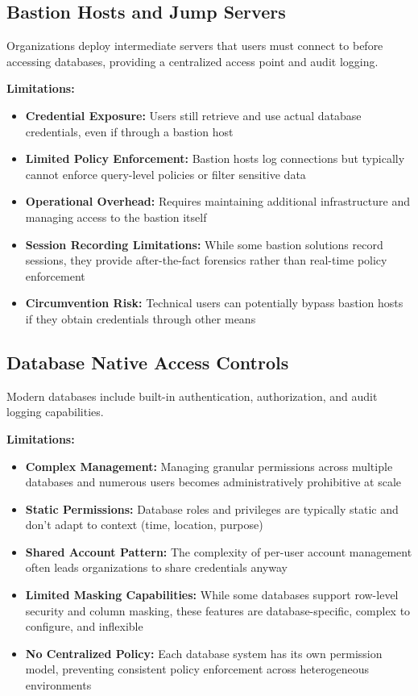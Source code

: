\subsection{Bastion Hosts and Jump Servers}
Organizations deploy intermediate servers that users must connect to before accessing databases, providing a centralized access point and audit logging.

\textbf{Limitations:}
\begin{itemize}
    \item \textbf{Credential Exposure:} Users still retrieve and use actual database credentials, even if through a bastion host
    \item \textbf{Limited Policy Enforcement:} Bastion hosts log connections but typically cannot enforce query-level policies or filter sensitive data
    \item \textbf{Operational Overhead:} Requires maintaining additional infrastructure and managing access to the bastion itself
    \item \textbf{Session Recording Limitations:} While some bastion solutions record sessions, they provide after-the-fact forensics rather than real-time policy enforcement
    \item \textbf{Circumvention Risk:} Technical users can potentially bypass bastion hosts if they obtain credentials through other means
\end{itemize}

\subsection{Database Native Access Controls}
Modern databases include built-in authentication, authorization, and audit logging capabilities.

\textbf{Limitations:}
\begin{itemize}
    \item \textbf{Complex Management:} Managing granular permissions across multiple databases and numerous users becomes administratively prohibitive at scale
    \item \textbf{Static Permissions:} Database roles and privileges are typically static and don't adapt to context (time, location, purpose)
    \item \textbf{Shared Account Pattern:} The complexity of per-user account management often leads organizations to share credentials anyway
    \item \textbf{Limited Masking Capabilities:} While some databases support row-level security and column masking, these features are database-specific, complex to configure, and inflexible
    \item \textbf{No Centralized Policy:} Each database system has its own permission model, preventing consistent policy enforcement across heterogeneous environments
\end{itemize}

